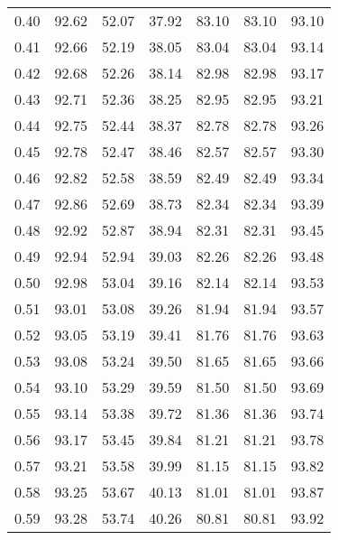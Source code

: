 \begin{tabular}{|c|c|c|c|c|c|c|}
      0.40 &     92.62 &     52.07 &      37.92 &   83.10 &      83.10 &         93.10 \\
      0.41 &     92.66 &     52.19 &      38.05 &   83.04 &      83.04 &         93.14 \\
      0.42 &     92.68 &     52.26 &      38.14 &   82.98 &      82.98 &         93.17 \\
      0.43 &     92.71 &     52.36 &      38.25 &   82.95 &      82.95 &         93.21 \\
      0.44 &     92.75 &     52.44 &      38.37 &   82.78 &      82.78 &         93.26 \\
      0.45 &     92.78 &     52.47 &      38.46 &   82.57 &      82.57 &         93.30 \\
      0.46 &     92.82 &     52.58 &      38.59 &   82.49 &      82.49 &         93.34 \\
      0.47 &     92.86 &     52.69 &      38.73 &   82.34 &      82.34 &         93.39 \\
      0.48 &     92.92 &     52.87 &      38.94 &   82.31 &      82.31 &         93.45 \\
      0.49 &     92.94 &     52.94 &      39.03 &   82.26 &      82.26 &         93.48 \\
      0.50 &     92.98 &     53.04 &      39.16 &   82.14 &      82.14 &         93.53 \\
      0.51 &     93.01 &     53.08 &      39.26 &   81.94 &      81.94 &         93.57 \\
      0.52 &     93.05 &     53.19 &      39.41 &   81.76 &      81.76 &         93.63 \\
      0.53 &     93.08 &     53.24 &      39.50 &   81.65 &      81.65 &         93.66 \\
      0.54 &     93.10 &     53.29 &      39.59 &   81.50 &      81.50 &         93.69 \\
      0.55 &     93.14 &     53.38 &      39.72 &   81.36 &      81.36 &         93.74 \\
      0.56 &     93.17 &     53.45 &      39.84 &   81.21 &      81.21 &         93.78 \\
      0.57 &     93.21 &     53.58 &      39.99 &   81.15 &      81.15 &         93.82 \\
      0.58 &     93.25 &     53.67 &      40.13 &   81.01 &      81.01 &         93.87 \\
      0.59 &     93.28 &     53.74 &      40.26 &   80.81 &      80.81 &         93.92 \\

\end{tabular}
